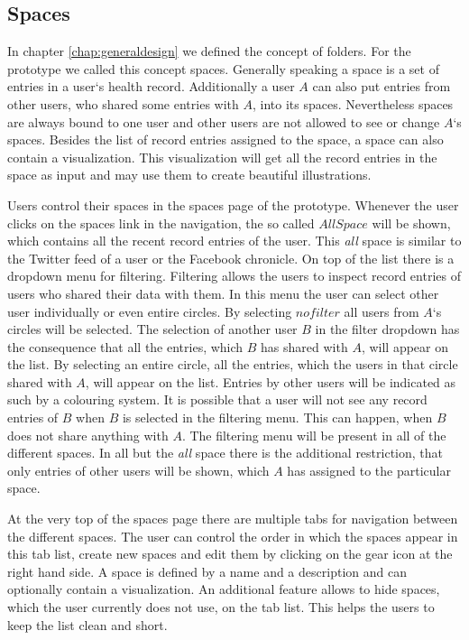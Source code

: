 \subsection{Spaces}\label{spaces}

In chapter \ref{chap:generaldesign} we defined the concept of folders. For the prototype we called this concept spaces. Generally speaking a space is a set of entries in a user`s health record. Additionally a user $A$ can also put entries from other users, who shared some entries with $A$, into its spaces. Nevertheless spaces are always bound to one user and other users are not allowed to see or change $A$`s spaces. Besides the list of record entries assigned to the space, a space can also contain a visualization. This visualization will get all the record entries in the space as input and may use them to create beautiful illustrations. 

Users control their spaces in the spaces page of the prototype. Whenever the user clicks on the spaces link in the navigation, the so called $All Space$ will be shown, which contains all the recent record entries of the user. This \emph{all} space is similar to the Twitter feed of a user or the Facebook chronicle. \newline
On top of the list there is a dropdown menu for filtering. Filtering allows the users to inspect record entries of users who shared their data with them. In this menu the user can select other user individually or even entire circles. By selecting $no filter$ all users from $A$`s circles will be selected. The selection of another user $B$ in the filter dropdown has the consequence that all the entries, which $B$ has shared with $A$, will appear on the list. By selecting an entire circle, all the entries, which the users in that circle shared with $A$, will appear on the list. Entries by other users will be indicated as such by a colouring system. It is possible that a user will not see any record entries of $B$ when $B$ is selected in the filtering menu. This can happen, when $B$ does not share anything with $A$. The filtering menu will be present in all of the different spaces. In all but the \emph{all} space there is the additional restriction, that only entries of other users will be shown, which $A$ has assigned to the particular space.

At the very top of the spaces page there are multiple tabs for navigation between the different spaces. The user can control the order in which the spaces appear in this tab list, create new spaces and edit them by clicking on the gear icon at the right hand side. A space is defined by a name and a description and can optionally contain a visualization. An additional feature allows to hide spaces, which the user currently does not use, on the tab list. This helps the users to keep the list clean and short. 


